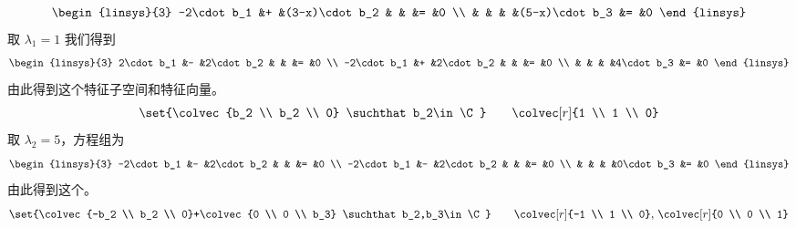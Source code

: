 \begin{exercises}
\begin{answer}
\begin{exparts}
\begin{equation*}
\begin{linsys}{3}
               -2\cdot b_1     &+  &(3-x)\cdot b_2  &   &   &=  &0  \\
                               &   &                &   &(5-x)\cdot b_3 &= &0 
             \end{linsys}
           \end{equation*}
           取 $\lambda_1=1$ 我们得到
           \begin{equation*}
             \begin{linsys}{3}
                2\cdot b_1     &-  &2\cdot b_2   &   &   &=  &0  \\
               -2\cdot b_1     &+  &2\cdot b_2   &   &   &=  &0  \\
                               &   &             &   &4\cdot b_3 &= &0 
             \end{linsys}
           \end{equation*}
           由此得到这个特征子空间和特征向量。
           \begin{equation*}
             \set{\colvec{b_2 \\ b_2 \\ 0}
                   \suchthat b_2\in\C}
             \qquad
             \colvec[r]{1 \\ 1 \\ 0}
           \end{equation*}
           取 $\lambda_2=5$，方程组为
           \begin{equation*}
             \begin{linsys}{3}
                -2\cdot b_1  &-  &2\cdot b_2   &   &   &=  &0  \\
               -2\cdot b_1   &-  &2\cdot b_2   &   &   &=  &0  \\
                             &   &             &   &0\cdot b_3 &= &0 
             \end{linsys}
           \end{equation*}
           由此得到这个。
           \begin{equation*}
             \set{\colvec{-b_2 \\ b_2 \\ 0}+\colvec{0 \\ 0 \\ b_3}
                   \suchthat b_2,b_3\in\C}
             \qquad
             \colvec[r]{-1 \\ 1 \\ 0},\,\colvec[r]{0 \\ 0 \\ 1}

\end{equation*}
\end{exparts}
\end{answer}
\end{exercises}
